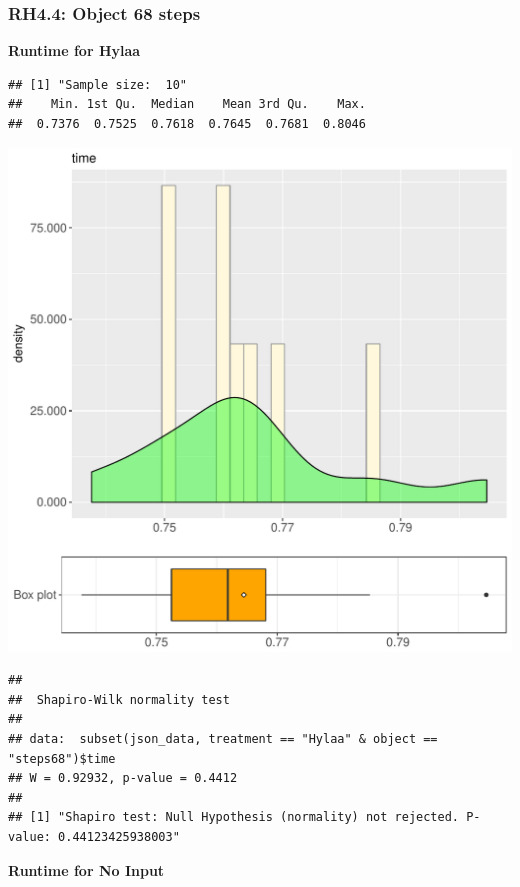 \documentclass{article}\usepackage[]{graphicx}\usepackage[]{color}
\makeatletter
\def\maxwidth{ %
  \ifdim\Gin@nat@width>\linewidth
    \linewidth
  \else
    \Gin@nat@width
  \fi
}
\newenvironment{kframe}{%
 \def\at@end@of@kframe{}%
 \ifinner\ifhmode%
  \def\at@end@of@kframe{\end{minipage}}%
  \begin{minipage}{\columnwidth}%
 \fi\fi%
 \def\FrameCommand##1{\hskip\@totalleftmargin \hskip-\fboxsep
 \colorbox{shadecolor}{##1}\hskip-\fboxsep
     \hskip-\linewidth \hskip-\@totalleftmargin \hskip\columnwidth}%
 \MakeFramed {\advance\hsize-\width
   \@totalleftmargin\z@ \linewidth\hsize
   \@setminipage}}%
 {\par\unskip\endMakeFramed%
 \at@end@of@kframe}
\newenvironment{knitrout}{}{} %
\makeatother
\begin{document}
\subsubsection{RH4.4: Object 68 steps}

 \textbf{Runtime for Hylaa}
\begin{knitrout}
\color{fgcolor}\begin{kframe}
\begin{verbatim}
## [1] "Sample size:  10"
##    Min. 1st Qu.  Median    Mean 3rd Qu.    Max. 
##  0.7376  0.7525  0.7618  0.7645  0.7681  0.8046
\end{verbatim}
\end{kframe}
\includegraphics[width=\maxwidth]{figure/RH4_Hylaa_steps68-1} 
\begin{kframe}\begin{verbatim}
## 
## 	Shapiro-Wilk normality test
## 
## data:  subset(json_data, treatment == "Hylaa" & object == "steps68")$time
## W = 0.92932, p-value = 0.4412
## 
## [1] "Shapiro test: Null Hypothesis (normality) not rejected. P-value: 0.44123425938003"
\end{verbatim}
\end{kframe}
\end{knitrout}
 \textbf{Runtime for No Input}
\end{document}
